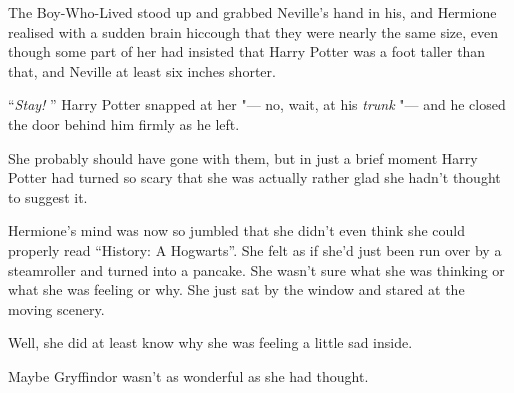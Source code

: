 The Boy-Who-Lived stood up and grabbed Neville's hand in his, and
Hermione realised with a sudden brain hiccough that they were nearly the
same size, even though some part of her had insisted that Harry Potter
was a foot taller than that, and Neville at least six inches shorter.

``\emph{Stay!} '' Harry Potter snapped at her "--- no, wait, at his
\emph{trunk} "--- and he closed the door behind him firmly as he left.

She probably should have gone with them, but in just a brief moment
Harry Potter had turned so scary that she was actually rather glad she
hadn't thought to suggest it.

Hermione's mind was now so jumbled that she didn't even think she could
properly read ``History: A Hogwarts''. She felt as if she'd just been
run over by a steamroller and turned into a pancake. She wasn't sure
what she was thinking or what she was feeling or why. She just sat by
the window and stared at the moving scenery.

Well, she did at least know why she was feeling a little sad inside.

Maybe Gryffindor wasn't as wonderful as she had thought.
